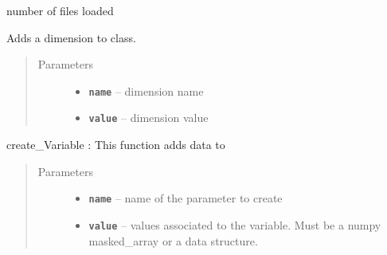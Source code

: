 \documentclass[letterpaper,10pt,english]{sphinxmanual}
\begin{document}
\begin{fulllineitems}
\begin{fulllineitems}
\label{altimetry.data:altimetry.data.hydro_data.count}
number of files loaded

\end{fulllineitems}


\begin{fulllineitems}
\label{altimetry.data:altimetry.data.hydro_data.create_Dim}
Adds a dimension to class.
\begin{quote}\begin{description}
\item[{Parameters}] \leavevmode\begin{itemize}
\item {} 
\textbf{\texttt{name}} -- dimension name

\item {} 
\textbf{\texttt{value}} -- dimension value

\end{itemize}

\end{description}\end{quote}

\end{fulllineitems}


\begin{fulllineitems}
\label{altimetry.data:altimetry.data.hydro_data.create_Variable}
create\_Variable : This function adds data to {\hyperref[altimetry.data:altimetry.data.hydro_data]{\emph{}}}
\begin{quote}\begin{description}
\item[{Parameters}] \leavevmode\begin{itemize}
\item {} 
\textbf{\texttt{name}} -- name of the parameter to create

\item {} 
\textbf{\texttt{value}} -- values associated to the variable. Must be a numpy masked\_array or a data structure.


\end{itemize}
\end{description}
\end{quote}
\end{fulllineitems}
\end{fulllineitems}
\end{document}
